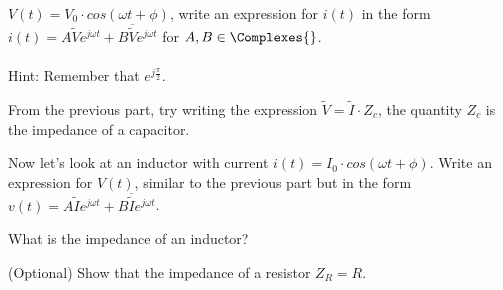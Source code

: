 \begin{enumerate}[resume]

\qitem $V(t) = V_{0} \cdot{} cos(\omega{}t + \phi{})$, write an expression for $i(t)$ in the form $i(t) = A\widetilde{V}e^{j\omega{}t} + B\overline{\widetilde{V}}e^{j\omega{}t}$ for $A, B \in{} \Complexes{}$.\\ \\
Hint: Remember that $e^{j\frac{\pi{}}{2}}$.

\sol{

}

\qitem From the previous part, try writing the expression $\widetilde{V} = \widetilde{I} \cdot Z_{c}$, the quantity $Z_{c}$ is the impedance of a capacitor.

\sol{

}

\qitem Now let's look at an inductor with current $i(t) = I_{0} \cdot cos(\omega{}t + \phi{})$. Write an expression for $V(t)$, similar to the previous part but in the form $v(t) = A\widetilde{I}e^{j\omega{}t} + B\overline{\widetilde{I}}e^{j\omega{}t}$.

\sol{

}

\qitem What is the impedance of an inductor?

\sol{

}

\qitem (Optional) Show that the impedance of a resistor $Z_{R} = R$.

\sol{

}

\end{enumerate}
